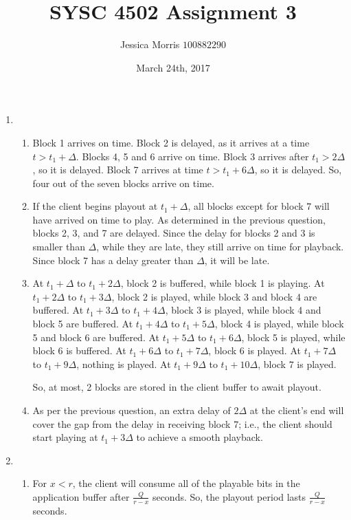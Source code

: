 \documentclass{article}
\title{SYSC 4502 Assignment 3}
\date{March 24th, 2017}
\author{Jessica Morris \(100882290\)}
\begin{document}
\maketitle

\begin{enumerate}

\item 
\begin{enumerate}
\item Block 1 arrives on time. Block 2 is delayed, as it arrives at a time $ t > t_1 + \Delta $. Blocks 4, 5 and 6 arrive on time. Block 3 arrives after $ t_1 > 2 \Delta $, so it is delayed. Block 7 arrives at time $ t > t_1 + 6 \Delta $, so it is delayed. So, four out of the seven blocks arrive on time.
\item If the client begins playout at $ t_1 + \Delta $, all blocks except for block 7 will have arrived on time to play. As determined in the previous question, blocks 2, 3, and 7 are delayed. Since the delay for blocks 2 and 3 is smaller than $\Delta$, while they are late, they still arrive on time for playback. Since block 7 has a delay greater than $\Delta$, it will be late.
\item At $t_1 + \Delta$ to $t_1 + 2\Delta$, block 2 is buffered, while block 1 is playing.
At $t_1 + 2\Delta$ to $t_1 + 3\Delta$, block 2 is played, while block 3 and block 4 are buffered.
At $t_1 + 3\Delta$ to $t_1 + 4\Delta$, block 3 is played, while block 4 and block 5 are buffered.
At $t_1 + 4\Delta$ to $t_1 + 5\Delta$, block 4 is played, while block 5 and block 6 are buffered.
At $t_1 + 5\Delta$ to $t_1 + 6\Delta$, block 5 is played, while block 6 is buffered.
At $t_1 + 6\Delta$ to $t_1 + 7\Delta$, block 6 is played.
At $t_1 + 7\Delta$ to $t_1 + 9\Delta$, nothing is played.
At $t_1 + 9\Delta$ to $t_1 + 10\Delta$, block 7 is played.

So, at most, 2 blocks are stored in the client buffer to await playout.
\item As per the previous question, an extra delay of $2\Delta$ at the client's end will cover the gap from the delay in receiving block 7; i.e., the client should start playing at $t_1 + 3\Delta$ to achieve a smooth playback.
\end{enumerate}

\item
\begin{enumerate}
\item For $ x < r $, the client will consume all of the playable bits in the application buffer after $ \frac{Q}{r-x} $ seconds. So, the playout period lasts $ \frac{Q}{r-x} $ seconds.


\end{enumerate}
\end{enumerate}
\end{document}
